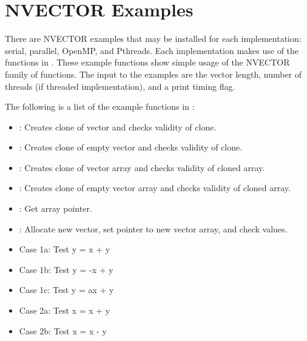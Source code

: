 \documentclass[letterpaper,10pt,english]{sphinxmanual}
\begin{document}
\section{NVECTOR Examples}
\label{nvectors/NVector_Examples:nvector-examples}\label{nvectors/NVector_Examples::doc}\label{nvectors/NVector_Examples:nvectors-examples}
There are NVECTOR examples that may be installed for each
implementation: serial, parallel, OpenMP, and Pthreads.  Each
implementation makes use of the functions in .
These example functions show simple usage of the NVECTOR family
of functions. The input to the examples are the vector length, number
of threads (if threaded implementation), and a print timing flag.

The following is a list of the example functions in :
\begin{itemize}
\item {} 
: Creates clone of vector and checks validity of clone.

\item {} 
: Creates clone of empty vector and checks validity of clone.

\item {} 
: Creates clone of vector array and checks validity of cloned array.

\item {} 
: Creates clone of empty vector array and checks validity of cloned array.

\item {} 
: Get array pointer.

\item {} 
: Allocate new vector, set pointer to new vector array, and check values.

\item {} 
 Case 1a: Test y =  x + y

\item {} 
 Case 1b: Test y = -x + y

\item {} 
 Case 1c: Test y = ax + y

\item {} 
 Case 2a: Test x =  x + y

\item {} 
 Case 2b: Test x =  x - y


\end{itemize}
\end{document}
